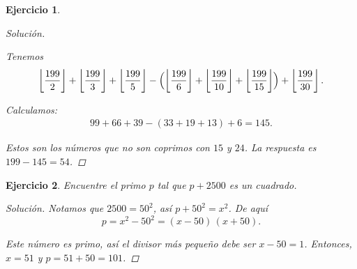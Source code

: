\documentclass{article}
\theoremstyle{plain}
\newtheorem{ejercicio}{Ejercicio}
\newenvironment{solucion}{\begin{proof}[Solución]}{\end{proof}}
\begin{document}
\begin{ejercicio}
\begin{solucion}
\begin{center}
    \end{center}

    Tenemos
    \[
        \left\lfloor\frac{199}{2}\right\rfloor + \left\lfloor\frac{199}{3}\right\rfloor + \left\lfloor\frac{199}{5}\right\rfloor
        - \Bigl(\left\lfloor\frac{199}{6}\right\rfloor + \left\lfloor\frac{199}{10}\right\rfloor + \left\lfloor\frac{199}{15}\right\rfloor\Bigr)
        + \left\lfloor\frac{199}{30}\right\rfloor.
    \]

    Calculamos:
    \begin{gather*}
        99 + 66 + 39 - (33 + 19 + 13) + 6 = 145.
    \end{gather*}
    
    Estos son los números que \emph{no son} coprimos con $15$ y $24$.
    La respuesta es $199 - 145 = 54$.
\end{solucion}
\fi
\end{ejercicio}

\pagebreak

\begin{ejercicio}
Encuentre el primo $p$ tal que $p + 2500$ es un cuadrado.

\ifdefined\solutions
\begin{solucion}
    Notamos que $2500 = 50^2$, así $p + 50^2 = x^2$. De aquí
    \[ p = x^2 - 50^2 = (x - 50)\,(x + 50). \]
    
    Este número es primo, así el divisor más pequeño debe ser $x - 50 = 1$.
    Entonces, $x = 51$ y $p = 51 + 50 = 101$.
\end{solucion}
\fi
\end{ejercicio}

\pagebreak
\end{document}
